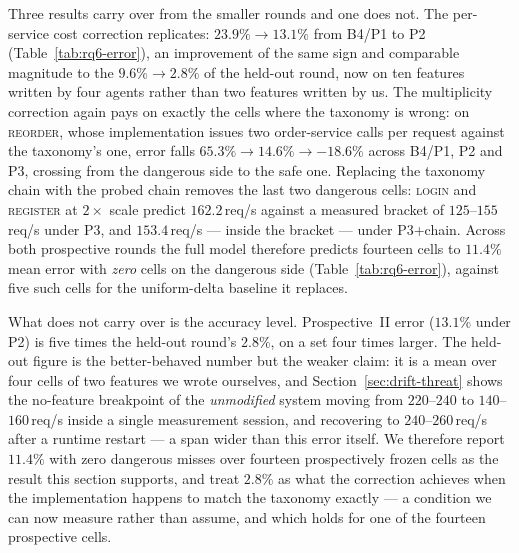 \documentclass[journal, 10pt]{IEEEtran}
\begin{document}
Three results carry over from the smaller rounds and one does not. The
per-service cost correction replicates: $23.9\%\to13.1\%$ from B4/P1 to P2
(Table~\ref{tab:rq6-error}), an improvement of the same sign and comparable
magnitude to the $9.6\%\to2.8\%$ of the held-out round, now on ten features
written by four agents rather than two features written by us. The multiplicity
correction again pays on exactly the cells where the taxonomy is wrong: on
\textsc{reorder}, whose implementation issues two order-service calls per
request against the taxonomy's one, error falls $65.3\%\to14.6\%\to-18.6\%$
across B4/P1, P2 and P3, crossing from the dangerous side to the safe one.
Replacing the taxonomy chain with the probed chain removes the last two
dangerous cells: \textsc{login} and \textsc{register} at $2\times$ scale predict
$162.2\,$req/s against a measured bracket of $125$--$155\,$req/s under P3, and
$153.4\,$req/s --- inside the bracket --- under P3+chain. Across both
prospective rounds the full model therefore predicts fourteen cells to
$11.4\%$ mean error with \emph{zero} cells on the dangerous side
(Table~\ref{tab:rq6-error}), against five such cells for the uniform-delta
baseline it replaces.

What does not carry over is the accuracy level. Prospective~II error
($13.1\%$ under P2) is five times the held-out round's $2.8\%$, on a set four
times larger. The held-out figure is the better-behaved number but the weaker
claim: it is a mean over four cells of two features we wrote ourselves, and
Section~\ref{sec:drift-threat} shows the no-feature breakpoint of the
\emph{unmodified} system moving from $220$--$240$ to $140$--$160\,$req/s inside a
single measurement session, and recovering to $240$--$260\,$req/s after a runtime
restart --- a span wider than this error itself. We therefore report
$11.4\%$ with zero dangerous misses over fourteen prospectively frozen cells as
the result this section supports, and treat $2.8\%$ as what the correction
achieves when the implementation happens to match the taxonomy exactly --- a
condition we can now measure rather than assume, and which holds for one of
the fourteen prospective cells.
\end{document}
